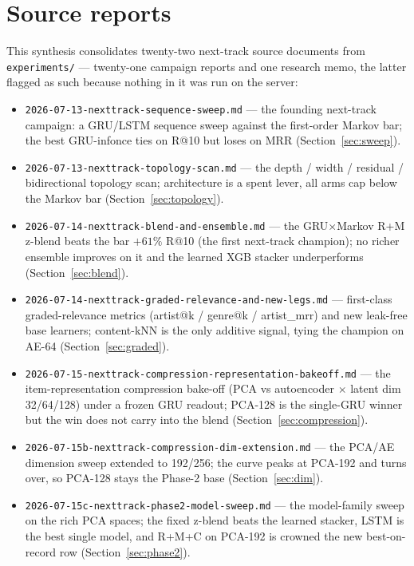 \documentclass[11pt]{article}
\begin{document}
\section{Source reports}
This synthesis consolidates twenty-two next-track source documents from
\texttt{experiments/} --- twenty-one campaign reports and one research memo, the
latter flagged as such because nothing in it was run on the server:
\begin{itemize}
  \item \texttt{2026-07-13-nexttrack-sequence-sweep.md} --- the founding
    next-track campaign: a GRU/LSTM sequence sweep against the first-order Markov
    bar; the best GRU-infonce ties on R@10 but loses on MRR
    (Section~\ref{sec:sweep}).
  \item \texttt{2026-07-13-nexttrack-topology-scan.md} --- the depth / width /
    residual / bidirectional topology scan; architecture is a spent lever, all
    arms cap below the Markov bar (Section~\ref{sec:topology}).
  \item \texttt{2026-07-14-nexttrack-blend-and-ensemble.md} --- the
    GRU$\times$Markov R+M z-blend beats the bar $+61\%$ R@10 (the first
    next-track champion); no richer ensemble improves on it and the learned XGB
    stacker underperforms (Section~\ref{sec:blend}).
  \item \texttt{2026-07-14-nexttrack-graded-relevance-and-new-legs.md} ---
    first-class graded-relevance metrics (artist@k / genre@k / artist\_mrr) and
    new leak-free base learners; content-kNN is the only additive signal, tying
    the champion on AE-64 (Section~\ref{sec:graded}).
  \item \texttt{2026-07-15-nexttrack-compression-representation-bakeoff.md} ---
    the item-representation compression bake-off (PCA vs autoencoder $\times$
    latent dim 32/64/128) under a frozen GRU readout; PCA-128 is the single-GRU
    winner but the win does not carry into the blend (Section~\ref{sec:compression}).
  \item \texttt{2026-07-15b-nexttrack-compression-dim-extension.md} --- the
    PCA/AE dimension sweep extended to 192/256; the curve peaks at PCA-192 and
    turns over, so PCA-128 stays the Phase-2 base (Section~\ref{sec:dim}).
  \item \texttt{2026-07-15c-nexttrack-phase2-model-sweep.md} --- the model-family
    sweep on the rich PCA spaces; the fixed z-blend beats the learned stacker,
    LSTM is the best single model, and R+M+C on PCA-192 is crowned the new
    best-on-record row (Section~\ref{sec:phase2}).

\end{itemize}
\end{document}
